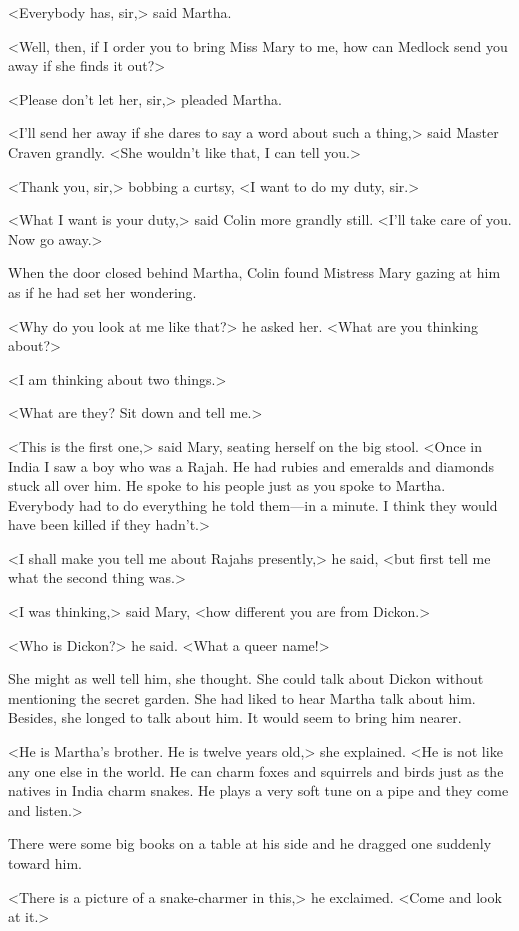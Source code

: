 <Everybody has, sir,> said Martha.

<Well, then, if I order you to bring Miss Mary to me, how can Medlock send you away if she finds it out?>

<Please don't let her, sir,> pleaded Martha.

<I'll send her away if she dares to say a word about such a thing,> said Master Craven grandly. <She wouldn't like that, I can tell you.>

<Thank you, sir,> bobbing a curtsy, <I want to do my duty, sir.>

<What I want is your duty,> said Colin more grandly still. <I'll take care of you. Now go away.>

When the door closed behind Martha, Colin found Mistress Mary gazing at him as if he had set her wondering.

<Why do you look at me like that?> he asked her. <What are you thinking about?>

<I am thinking about two things.>

<What are they? Sit down and tell me.>

<This is the first one,> said Mary, seating herself on the big stool. <Once in India I saw a boy who was a Rajah. He had rubies and emeralds and diamonds stuck all over him. He spoke to his people just as you spoke to Martha. Everybody had to do everything he told them—in a minute. I think they would have been killed if they hadn't.>

<I shall make you tell me about Rajahs presently,> he said, <but first tell me what the second thing was.>

<I was thinking,> said Mary, <how different you are from Dickon.>

<Who is Dickon?> he said. <What a queer name!>

She might as well tell him, she thought. She could talk about Dickon without mentioning the secret garden. She had liked to hear Martha talk about him. Besides, she longed to talk about him. It would seem to bring him nearer.

<He is Martha's brother. He is twelve years old,> she explained. <He is not like any one else in the world. He can charm foxes and squirrels and birds just as the natives in India charm snakes. He plays a very soft tune on a pipe and they come and listen.>

There were some big books on a table at his side and he dragged one suddenly toward him.

<There is a picture of a snake-charmer in this,> he exclaimed. <Come and look at it.>

